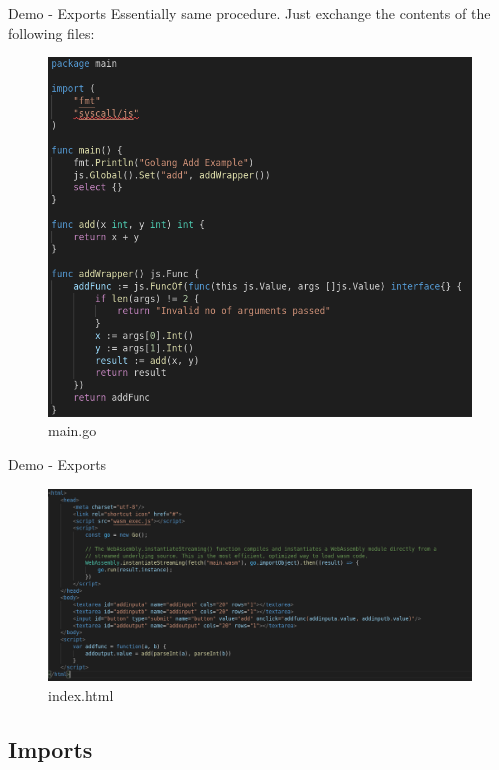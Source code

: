 \documentclass{beamer}
\begin{document}
\begin{frame}{Demo - Exports}
    Essentially same procedure. Just exchange the contents of the following files:
    \begin{figure}
        \includegraphics[scale=0.2]{./images/main.png}
        \caption{main.go}
    \end{figure}

\end{frame}

\begin{frame}{Demo - Exports}
    \begin{figure}
        \includegraphics[scale=0.2]{./images/index.png}
        \caption{index.html}
    \end{figure}

\end{frame}

\subsection{Imports}
\end{document}
